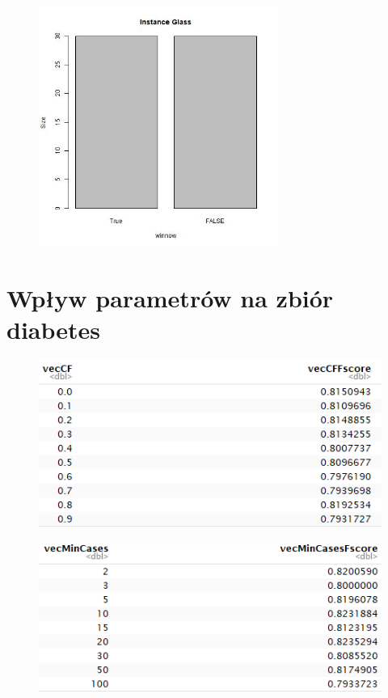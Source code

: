 \documentclass[12pt,a4paper]{article}
\begin{document}
\begin{figure}[H]
\centering
\includegraphics[width=0.7\textwidth]{glassSizeWinnow.jpg}
\end{figure}

\section{Wpływ parametrów na zbiór diabetes}

\begin{figure}[H]
\centering
\includegraphics{diabetesDFCF.PNG}
\end{figure}

\begin{figure}[H]
\centering
\includegraphics{diabetesDFminCases.png}
\end{figure}
\end{document}
